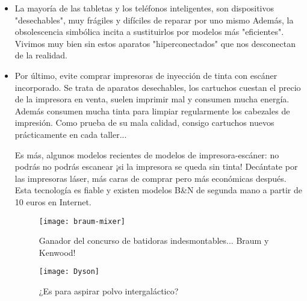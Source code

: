 \begin{itemize}
\item La mayoría de las tabletas y los teléfonos inteligentes, son dispositivos "desechables", muy frágiles y difíciles de reparar por uno mismo Además, la obsolescencia simbólica incita a sustituirlos por modelos más "eficientes". Vivimos muy bien sin estos aparatos "hiperconectados" que nos desconectan de la realidad.

\item Por último, evite comprar impresoras de inyección de tinta con escáner incorporado. Se trata de aparatos desechables, los cartuchos cuestan el precio de la impresora en venta, suelen imprimir mal y consumen mucha energía. Además consumen mucha tinta para limpiar regularmente los cabezales de impresión. Como prueba de su mala calidad, consigo cartuchos nuevos prácticamente en cada taller...

Es más, algunos modelos recientes de modelos de impresora-escáner: no podrás no podrás escanear ¡si la impresora se queda sin tinta! Decántate por las impresoras láser, más caras de comprar pero más económicas después. Esta tecnología es fiable y existen modelos B\&N de segunda mano a partir de 10 euros en Internet.

\begin{figure}[h]
    \centering
    \begin{minipage}[b]{0.4\textwidth}
        \centering
        \texttt{[image: braum-mixer]} 
        \caption*{Ganador del concurso de batidoras indesmontables... Braum y Kenwood!}
    \end{minipage}
    \hfill
    \begin{minipage}[b]{0.4\textwidth}
        \centering
        \texttt{[image: Dyson]} 
        \caption*{¿Es para aspirar polvo intergaláctico?}
    \end{minipage}
\end{figure}



\end{itemize}

